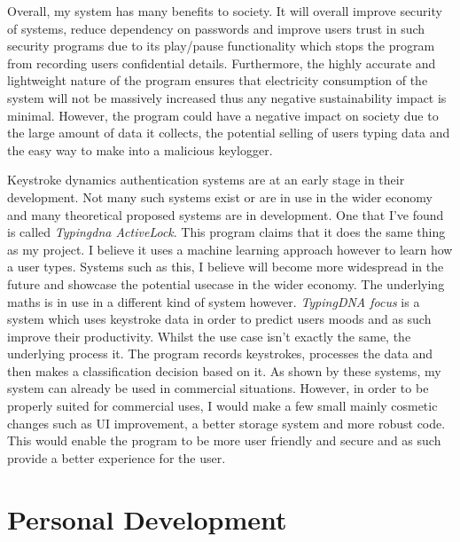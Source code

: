 \documentclass[10pt,a4paper]{report}
\begin{document}
Overall, my system has many benefits to society. It will overall improve security of systems, reduce dependency on passwords and improve users trust in such security programs due to its play/pause functionality which stops the program from recording users confidential details. Furthermore, the highly accurate and lightweight nature of the program ensures that electricity consumption of the system will not be massively increased thus any negative sustainability impact is minimal. However, the program could have a negative impact on society due to the large amount of data it collects, the potential selling of users typing data and the easy way to make into a malicious keylogger. 

Keystroke dynamics authentication systems are at an early stage in their development. Not many such systems exist or are in use in the wider economy and many theoretical proposed systems are in development. One that I've found is called \emph{Typingdna ActiveLock}\cite{typingdna_2022}. This program claims that it does the same thing as my project. I believe it uses a machine learning approach however to learn how a user types. Systems such as this, I believe will become more widespread in the future and showcase the potential usecase in the wider economy.  The underlying maths is in use in a different kind of system however. \emph{TypingDNA focus}\cite{typingdna_2021} is a system which uses keystroke data in order to predict users moods and as such improve their productivity. Whilst the use case isn't exactly the same, the underlying process it. The program records keystrokes, processes the data and then makes a classification decision based on it. As shown by these systems, my system can already be used in commercial situations. However, in order to be properly suited for commercial uses, I would make a few small mainly cosmetic changes such as UI improvement, a better storage system and more robust code. This would enable the program to be more user friendly and secure and as such provide a better experience for the user.


\section{Personal Development}
\end{document}
